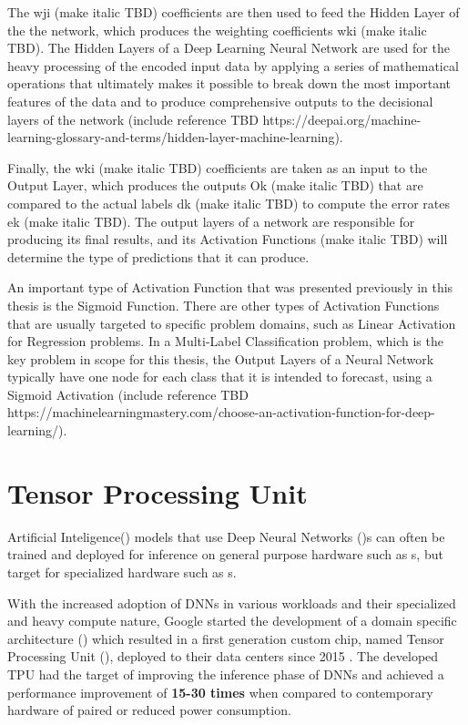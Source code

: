 \documentclass[openright]{normas-utf-tex} %
\begin{document}
The wji (make italic TBD) coefficients are then used to feed the Hidden Layer of the the network,
which produces the weighting coefficients wki (make italic TBD). The Hidden Layers of a Deep Learning 
Neural Network are used for the heavy processing of the encoded input data by applying a series of 
mathematical operations that ultimately makes it possible to break down the most important features
of the data and to produce comprehensive outputs to the decisional layers of the network (include reference 
TBD https://deepai.org/machine-learning-glossary-and-terms/hidden-layer-machine-learning).

Finally, the wki (make italic TBD) coefficients are taken as an input to the Output Layer, 
which produces the outputs Ok (make italic TBD) that are compared to the actual labels dk 
(make italic TBD) to compute the error rates ek (make italic TBD). The output layers of a network
are responsible for producing its final results, and its Activation Functions (make italic TBD) 
will determine the type of predictions that it can produce. 

An important type of Activation Function that was presented previously in this thesis is the 
Sigmoid Function. There are other types of Activation Functions that are usually targeted 
to specific problem domains, such as Linear Activation for Regression problems. 
In a Multi-Label Classification problem, which is the key problem in scope for this
thesis, the Output Layers of a Neural Network typically have one node for each class that it is
intended to forecast, using a Sigmoid Activation 
(include reference TBD https://machinelearningmastery.com/choose-an-activation-function-for-deep-learning/).

\section{Tensor Processing Unit}

Artificial Inteligence() models that use Deep Neural 
Networks ()s can often be trained and deployed for inference
on general purpose hardware such as s, but target 
for specialized hardware such as s.

With the increased adoption of DNNs in various workloads and their specialized
and heavy compute nature, Google started the development of a domain specific
architecture () which resulted in a
first generation custom chip, named Tensor Processing Unit (), deployed to their data centers since 2015 \cite{Google2015}.
The developed TPU had the target of improving the inference phase of DNNs and
achieved a performance improvement of \textbf{15-30 times} when compared to
contemporary hardware of paired or reduced power consumption.
\end{document}
